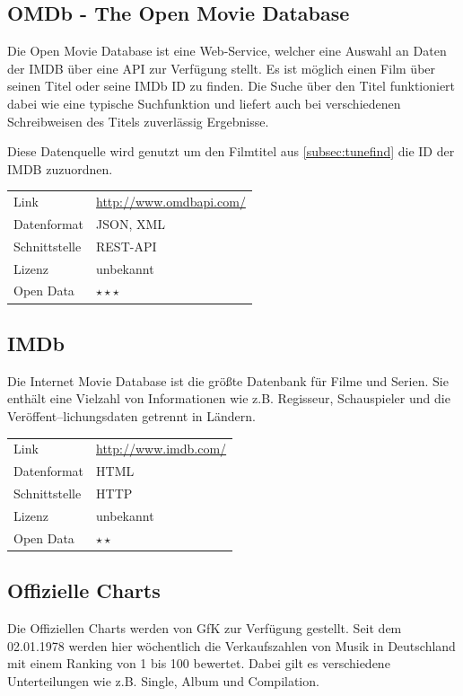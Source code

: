 \documentclass[parskip]{scrartcl}
\begin{document}
\subsection{OMDb - The Open Movie Database}

Die Open Movie Database ist eine Web-Service, welcher eine Auswahl an Daten der IMDB über eine API zur Verfügung stellt. Es ist möglich einen Film über seinen  Titel oder seine IMDb ID zu finden. Die Suche über den Titel funktioniert dabei wie eine typische Suchfunktion und liefert auch bei verschiedenen Schreibweisen des Titels zuverlässig Ergebnisse.

Diese Datenquelle wird genutzt um den Filmtitel aus \ref{subsec:tunefind} die ID der IMDB zuzuordnen.

\begin{tabular}{l|p{9cm}}
    Link & \url{http://www.omdbapi.com/} \\
    Datenformat & JSON, XML \\
    Schnittstelle & REST-API \\
    Lizenz & unbekannt \\
    Open Data & $\star\star\star$ \\
\end{tabular}

\subsection{IMDb}

Die Internet Movie Database ist die größte Datenbank für Filme und Serien. Sie enthält eine Vielzahl von Informationen wie z.B. Regisseur, Schauspieler und die Veröffent--lichungsdaten getrennt in Ländern.

\begin{tabular}{l|p{9cm}}
	Link & \url{http://www.imdb.com/} \\
 	Datenformat & HTML \\
 	Schnittstelle & HTTP \\
 	Lizenz & unbekannt \\
 	Open Data & $\star\star$ \\
\end{tabular}

\subsection{Offizielle Charts}

Die Offiziellen Charts werden von GfK zur Verfügung gestellt. Seit dem 02.01.1978 werden hier wöchentlich die Verkaufszahlen von Musik in Deutschland mit einem Ranking von 1 bis 100 bewertet. Dabei gilt es verschiedene Unterteilungen wie z.B. Single, Album und Compilation.
\end{document}
